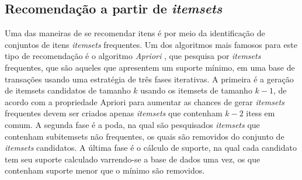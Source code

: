 \subsection{Recomendação a partir de \emph{itemsets}}\label{AAPRIORI}
Uma das maneiras de se recomendar itens é por meio da identificação de conjuntos de itens \emph{itemsets} frequentes. Um dos algoritmos mais famosos para este tipo de recomendação é o algoritmo \emph{Apriori} \cite{Agrawal1994}, que pesquisa por \emph{itemsets} frequentes, que são aqueles que apresentem um suporte mínimo, em uma base de transações usando uma estratégia de três fases iterativas. A primeira é a geração de itemsets candidatos de tamanho \(k\) usando os itemsets de tamanho \(k-1\), de acordo com a propriedade Apriori para aumentar as chances de gerar \emph{itemsets} frequentes devem ser criados apenas \emph{itemsets} que contenham \(k-2\) itess em comum. A segunda fase é a poda, na qual são pesquisados \emph{itemsets} que contenham subitemsets não frequentes, os quais são removidos do conjunto de \emph{itemsets} candidatos. A última fase é o cálculo de suporte, na qual cada candidato tem seu suporte calculado varrendo-se a base de dados uma vez, os que contenham suporte menor que o mínimo são removidos. 

